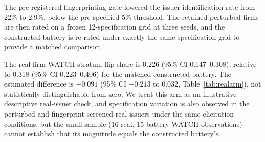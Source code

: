 \documentclass[a4paper,fleqn]{cas-sc}
\begin{document}
The pre-registered fingerprinting gate lowered the issuer-identification rate from 22\% to 2.9\%, below
the pre-specified 5\% threshold. The retained perturbed firms are then rated on a frozen 12-specification grid
at three seeds, and the constructed battery is re-rated under exactly the same specification grid to
provide a matched comparison.

The real-firm WATCH-stratum flip share is 0.226 (95\% CI 0.147--0.308), relative to 0.318 (95\% CI
0.223--0.406) for the matched constructed battery. The estimated difference is $-0.091$ (95\% CI $-0.213$
to $0.032$, Table~\ref{tab:realarm}), not statistically distinguishable from zero. We treat this arm as an
illustrative descriptive real-issuer check, and specification variation is also observed
in the perturbed and fingerprint-screened real issuers under the same elicitation conditions, but the small sample (16 real, 15
battery WATCH observations) cannot establish that its magnitude equals the constructed battery's.
\end{document}
